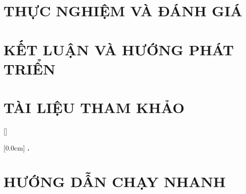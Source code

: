 \documentclass[a4paper,twoside]{report}
\theoremstyle{definition}
\begin{document}
\newpage
\chapter{THỰC NGHIỆM VÀ ĐÁNH GIÁ}


\newpage
\chapter{KẾT LUẬN VÀ HƯỚNG PHÁT TRIỂN}


\newpage
\chapter*{TÀI LIỆU THAM KHẢO}
\printbibliography[heading=none]

\appendixpage
\appendix
\addappheadtotoc

[]
\titlespacing*{\chapter}{0pt}{-20pt}{20pt}

    [0.0cm]             %
    {\bfseries\vspace{0.3cm}}                  %
    {{\bfseries \thecontentslabel.\ }} %
    {}         %
    {\contentspage} 
    
\chapter{HƯỚNG DẪN CHẠY NHANH}

\end{document}
